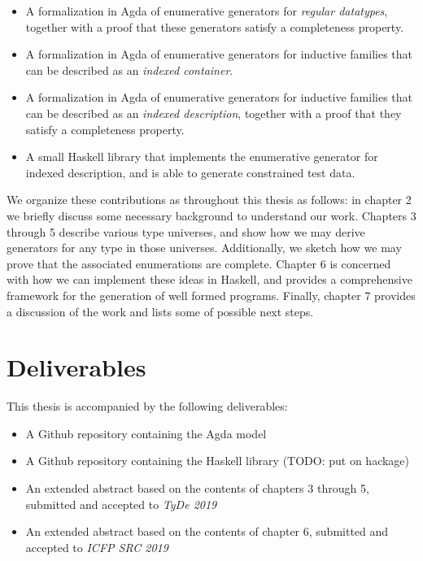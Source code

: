 \documentclass[a4paper,msc,twosized=semi]{uustthesis}
\begin{document}
  \begin{itemize}
    \item 
      A formalization in Agda of enumerative generators for \emph{regular datatypes}, 
      together with a proof that these generators satisfy a completeness property. 

    \item 
      A formalization in Agda of enumerative generators for inductive families that 
      can be described as an \emph{indexed container}. 

    \item 
      A formalization in Agda of enumerative generators for inductive families that 
      can be described as an \emph{indexed description}, together with a proof that 
      they satisfy a completeness property. 

    \item 
      A small Haskell library that implements the enumerative generator for indexed 
      description, and is able to generate constrained test data. 
  \end{itemize}

  We organize these contributions as throughout this thesis as follows: in chapter 2 
  we briefly discuss some necessary background to understand our work. Chapters 3 
  through 5 describe various type universes, and show how we may derive generators for 
  any type in those universes. Additionally, we sketch how we may prove that the 
  associated enumerations are complete. Chapter 6 is concerned with how we can 
  implement these ideas in Haskell, and provides a comprehensive framework for the 
  generation of well formed programs. Finally, chapter 7 provides a discussion of the 
  work and lists some of possible next steps. 

\section{Deliverables}

  This thesis is accompanied by the following deliverables: 

  \begin{itemize}
    \item 
      A Github repository containing the Agda model

    \item 
      A Github repository containing the Haskell library (TODO: put on hackage)

    \item 
      An extended abstract based on the contents of chapters 3 through 5, submitted 
      and accepted to \emph{TyDe 2019}

    \item 
      An extended abstract based on the contents of chapter 6, submitted and accepted 
      to \emph{ICFP SRC 2019} 
  \end{itemize}
\end{document}
